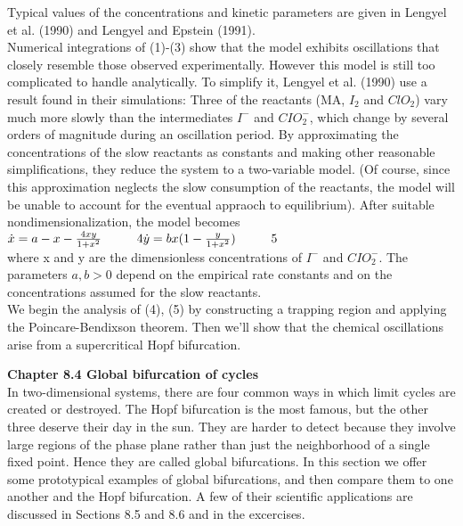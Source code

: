 \documentclass{article}
\newcommand\tab[1][1cm]{\hspace*{#1}}
\begin{document}
Typical values of the concentrations and kinetic parameters are given in Lengyel et al. (1990) and Lengyel and Epstein (1991). \\ \tab
Numerical integrations of (1)-(3) show that the model exhibits oscillations that closely resemble those observed experimentally. However this model is still too complicated to handle analytically. To simplify it, Lengyel et al. (1990) use a result found in their simulations: Three of the reactants (MA, $I_{2}$ and $ClO_{2}$) vary much more slowly than the intermediates $I^{-}$ and $CIO_{2}^{-}$, which change by several orders of magnitude during an oscillation period. By approximating the concentrations of the slow reactants as constants and making other reasonable simplifications, they reduce the system to a two-variable model. (Of course, since this approximation neglects the slow consumption of the reactants, the model will be unable to account for the eventual appraoch to equilibrium). After suitable nondimensionalization, the model becomes \\ \tab
$\dot{x}=a-x-\frac{4xy}{1+x^{2}} \tab 4 \\
\dot{y}=bx(1-\frac{y}{1+x^{2}}) \tab 5 $ \\
where x and y are the dimensionless concentrations of $I^{-}$ and $CIO_{2}^{-}$. The parameters $a, b > 0$ depend on the empirical rate constants and on the concentrations assumed for the slow reactants. \\
\tab
We begin the analysis of (4), (5) by constructing a trapping region and applying the Poincare-Bendixson theorem. Then we'll show that the chemical oscillations arise from a supercritical Hopf bifurcation.

\textbf {Chapter 8.4 Global bifurcation of cycles} \\ 
In two-dimensional systems, there are four common ways in which limit cycles are created or destroyed. The Hopf bifurcation is the most famous, but the other three deserve their day in the sun. They are harder to detect because they involve large regions of the phase plane rather than just the neighborhood of a single fixed point. Hence they are called global bifurcations. In this section we offer some prototypical examples of global bifurcations, and then compare them to one another and the Hopf bifurcation. A few of their scientific applications are discussed in Sections 8.5 and 8.6 and in the excercises. 
\end{document}
